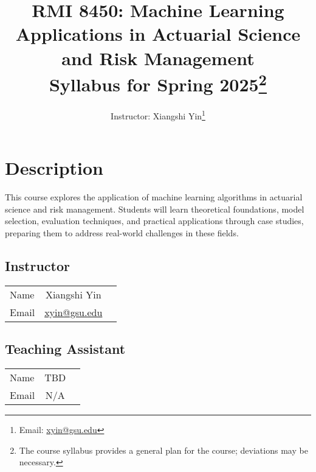 \documentclass[a4paper, 12pt]{article}
\title{
    RMI 8450: Machine Learning Applications in Actuarial Science and Risk Management\\
    \large Syllabus for Spring 2025\footnote{The course syllabus provides a general plan for the course; deviations may be necessary.}
}
\author{Instructor: Xiangshi Yin\thanks{Email: \href{mailto:xyin@gsu.edu}{xyin@gsu.edu}}}
\begin{document}
\maketitle

\tableofcontents

\section{Description}
This course explores the application of machine learning algorithms in actuarial science and risk management. Students will learn theoretical foundations, model selection, evaluation techniques, and practical applications through case studies, preparing them to address real-world challenges in these fields.

\subsection{Instructor}
\begin{center}
  \begin{tabular}{ l | c r }
    \hline			
    Name & Xiangshi Yin\\
    Email & \href{mailto:xyin@gsu.edu}{xyin@gsu.edu}\\
    \hline  
  \end{tabular}
\end{center}

\subsection{Teaching Assistant}
\begin{center}
	\begin{tabular}{ l | c r }
		\hline			
		Name & TBD\\
		Email & N/A\\
		\hline  
	\end{tabular}
\end{center}
\end{document}
